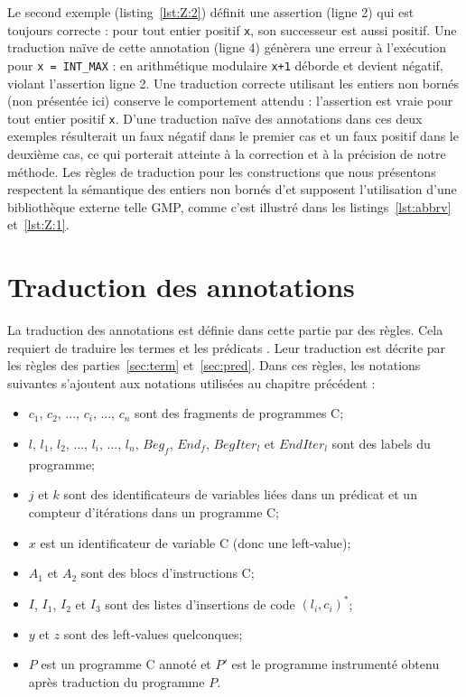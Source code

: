 Le second exemple (listing~\ref{lst:Z:2}) définit une assertion \eacsl (ligne 2)
qui est toujours correcte : pour tout entier positif \lstinline'x', son
successeur est aussi positif.
Une traduction naïve de cette annotation (ligne 4) génèrera une erreur à
l'exécution pour \lstinline'x = INT_MAX' : en arithmétique modulaire
\lstinline'x+1' déborde et devient négatif, violant l'assertion ligne 2.
Une traduction correcte utilisant les entiers non bornés (non présentée ici)
conserve le comportement attendu : l'assertion est vraie pour tout entier
positif \lstinline'x'.
D'une traduction naïve des annotations dans ces deux exemples résulterait un
faux négatif dans le premier cas et un faux positif dans le deuxième cas, ce
qui porterait atteinte à la correction et à la précision de notre méthode.
Les règles de traduction pour les constructions \eacsl que nous présentons
respectent la sémantique des entiers non bornés d'\eacsl et supposent
l'utilisation d'une bibliothèque externe telle GMP, comme c'est illustré dans
les listings~\ref{lst:abbrv} et~\ref{lst:Z:1}.


\section{Traduction des annotations \eacsl}
\label{sec:annot}


La traduction des annotations est définie dans cette partie par des règles.
Cela requiert de traduire les termes et les prédicats \eacsl.
Leur traduction est décrite par les règles des parties~\ref{sec:term}
et~\ref{sec:pred}.
Dans ces règles, les notations suivantes s'ajoutent aux notations utilisées au
chapitre précédent :
\begin{itemize}
\item $c_1$, $c_2$, ..., $c_i$, ..., $c_n$ sont des fragments de programmes C;
\item $l$, $l_1$, $l_2$, ..., $l_i$, ..., $l_n$, $\mathit{Beg_f}$,
  $\mathit{End_f}$, $\mathit{BegIter_l}$ et $\mathit{EndIter_l}$ sont des labels
  du programme;
\item $j$ et $k$ sont des identificateurs de variables liées
  dans un prédicat \eacsl et un compteur d'itérations dans un programme C;
\item $x$ est un identificateur de variable C (donc une left-value);
\item $A_1$ et $A_2$ sont des blocs d'instructions C;
\item $I$, $I_1$, $I_2$ et $I_3$ sont des listes d'insertions de code
  $(l_i, c_i)^*$;
\item $y$ et $z$ sont des left-values quelconques;
\item $P$ est un programme C annoté et $P'$ est le programme instrumenté
  obtenu après traduction du programme $P$.
\end{itemize}

